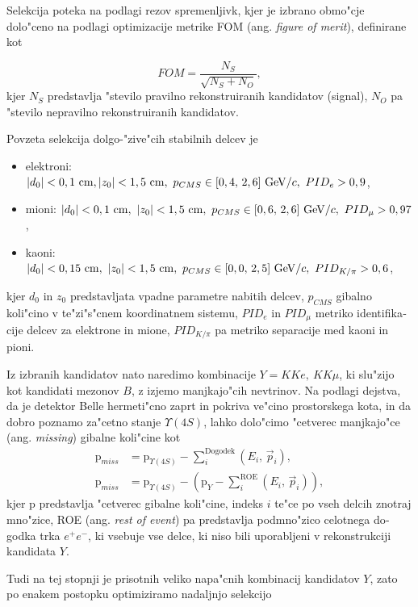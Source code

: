 \begin{otherlanguage}{slovene}
Selekcija poteka na podlagi rezov spremenljivk, kjer je izbrano obmo"cje dolo"ceno na podlagi optimizacije metrike FOM (ang. \textit{figure of merit}), definirane kot 

\begin{equation}
FOM = \frac{N_S}{\sqrt{N_S + N_O}},
\end{equation}
kjer $N_S$ predstavlja "stevilo pravilno rekonstruiranih kandidatov (signal), $N_O$ pa "stevilo nepravilno rekonstruiranih kandidatov.

Povzeta selekcija dolgo-"zive"cih stabilnih delcev je
\begin{itemize}
\item elektroni: $\vert d_0 \vert < 0,1\mathrm{~cm}, \vert z_0 \vert < 1,5\mathrm{~cm},~p_{CMS} \in [0,4,\,2,6]\mathrm{~GeV}/c,~PID_e > 0,9$,
\item mioni: $\vert d_0 \vert < 0,1\mathrm{~cm},~\vert z_0 \vert < 1,5\mathrm{~cm},~p_{CMS} \in [0,6,\,2,6]\mathrm{~GeV}/c,~PID_\mu > 0,97$,
\item kaoni: $\vert d_0 \vert < 0,15\mathrm{~cm},~\vert z_0 \vert < 1,5\mathrm{~cm},~p_{CMS} \in [0,0,\,2,5]\mathrm{~GeV}/c,~PID_{K/\pi} > 0,6$,
\end{itemize}
kjer $d_0$ in $z_0$ predstavljata vpadne parametre nabitih delcev, $p_{CMS}$ gibalno koli"cino v te"zi"s"cnem koordinatnem sistemu, $PID_e$ in $PID_\mu$ metriko identifikacije delcev za elektrone in mione, $PID_{K/\pi}$ pa metriko separacije med kaoni in pioni.

Iz izbranih kandidatov nato naredimo kombinacije $Y = KKe,~KK\mu$, ki slu"zijo kot kandidati mezonov $B$, z izjemo manjkajo"cih nevtrinov. Na podlagi dejstva, da je detektor Belle hermeti"cno zaprt in pokriva ve"cino prostorskega kota, in da dobro poznamo za"cetno stanje $\Upsilon(4S)$, lahko dolo"cimo "cetverec manjkajo"ce (ang. \textit{missing}) gibalne koli"cine kot
\begin{align}
\mathrm{p}_{miss} &= \mathrm{p}_{\Upsilon(4S)} - \sum_i^{\mathrm{Dogodek}}\left(E_i,\,\vec{p}_i \right),\\
\label{eq:ROEloop_si}
\mathrm{p}_{miss} &= \mathrm{p}_{\Upsilon(4S)} - \left(\mathrm{p}_{Y} -\sum_i^{\mathrm{ROE}}\left(E_i,\,\vec{p}_i \right)\right),
\end{align}
kjer $\mathrm{p}$ predstavlja "cetverec gibalne koli"cine, indeks $i$ te"ce po vseh delcih znotraj mno"zice, ROE (ang. \textit{rest of event}) pa predstavlja podmno"zico celotnega dogodka trka $e^+e^-$, ki vsebuje vse delce, ki niso bili uporabljeni v rekonstrukciji kandidata $Y$.

Tudi na tej stopnji je prisotnih veliko napa"cnih kombinacij kandidatov $Y$, zato po enakem postopku optimiziramo nadaljnjo selekcijo


\end{otherlanguage}
